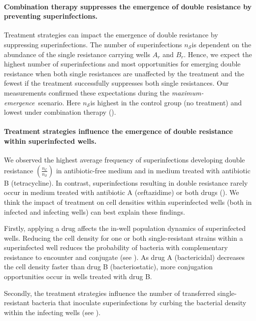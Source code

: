 \paragraph{Combination therapy suppresses the emergence of double resistance by preventing superinfections.}
Treatment strategies can impact the emergence of double resistance by suppressing superinfections.
The number of superinfections $n_{\mathcal S}$is dependent on the abundance of the single resistance carrying wells $A_r$ and $B_r$.
Hence, we expect the highest number of superinfections and most opportunities for emerging double resistance when both single resistances are unaffected by the treatment and the fewest if the treatment successfully suppresses both single resistances.
Our measurements confirmed these expectations during the \textit{maximum-emergence}~scenario.
Here $n_{\mathcal S}$is highest in the control group (no treatment) and lowest under combination therapy ().

\paragraph{Treatment strategies influence the emergence of double resistance within superinfected wells.}
We observed the highest average frequency of superinfections developing double resistance $(\frac{n_{\mathcal E}}{n_{\mathcal S}})$ in antibiotic-free medium and in medium treated with antibiotic B (tetracycline).
In contrast, superinfections resulting in double resistance rarely occur in medium treated with antibiotic A (ceftazidime) or both drugs ().
We think the impact of treatment on cell densities within superinfected wells (both in infected and infecting wells) can best explain these findings.

Firstly, applying a drug affects the in-well population dynamics of superinfected wells.
Reducing the cell density for one or both single-resistant strains within a superinfected well reduces the probability of bacteria with complementary resistance to encounter and conjugate (see ).
As drug A (bactericidal) decreases the cell density faster than drug B (bacteriostatic), more conjugation opportunities occur in wells treated with drug B.

Secondly, the treatment strategies influence the number of transferred single-resistant bacteria that inoculate superinfections by curbing the bacterial density within the infecting wells (see ).

